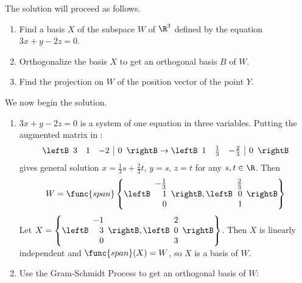 \begin{solution}
The solution will proceed as follows.
\begin{enumerate}
\item Find a basis $X$ of the subspace $W$ of $\R^3$ defined by
the equation  $3x+y-2z=0$.
\item Orthogonalize the basis $X$ to get an orthogonal basis
$B$ of $W$.
\item Find the projection on $W$ of the position vector of
the point $Y$.
\end{enumerate}

We now begin the solution.
\begin{enumerate}
\item $3x+y-2z=0$ is a system of one equation in three variables.
Putting the augmented matrix in {\rref}:
\[
\leftB\begin{array}{rrr|r} 3 & 1 & -2 & 0 \end{array}\rightB
\rightarrow
\leftB\begin{array}{rrr|r} 1 & \frac{1}{3} & -\frac{2}{3} & 0 \end{array}\rightB
\]
gives general solution $x=\frac{1}{3}s+\frac{2}{3}t$, $y=s$, $z=t$
for any $s,t\in\R$.
Then  
\[
W=\func{span} \left\{
\leftB\begin{array}{r} -\frac{1}{3} \\ 1 \\ 0 \end{array}\rightB,
\leftB\begin{array}{r} \frac{2}{3} \\ 0 \\ 1 \end{array}\rightB\right\}
\]
Let
$X=\left\{
\leftB\begin{array}{r} -1 \\ 3 \\ 0 \end{array}\rightB,
\leftB\begin{array}{r} 2 \\ 0 \\ 3 \end{array}\rightB\right\}$.
Then $X$ is linearly independent and $\func{span}(X)=W$, so $X$ is a basis of $W$.

\item Use the Gram-Schmidt Process to get an
orthogonal basis of $W$: 



\end{enumerate}
\end{solution}
